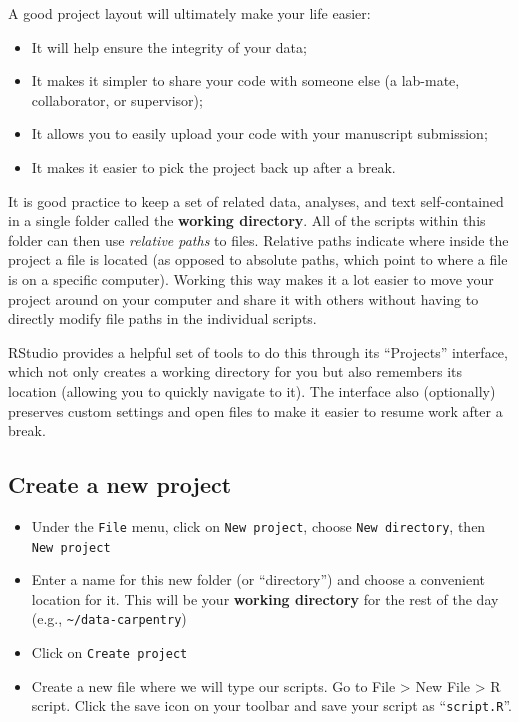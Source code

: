 \documentclass[]{book}
\providecommand{\tightlist}{%
  \setlength{\itemsep}{0pt}\setlength{\parskip}{0pt}}
\begin{document}
A good project layout will ultimately make your life easier:

\begin{itemize}
\tightlist
\item
  It will help ensure the integrity of your data;
\item
  It makes it simpler to share your code with someone else (a lab-mate,
  collaborator, or supervisor);
\item
  It allows you to easily upload your code with your manuscript
  submission;
\item
  It makes it easier to pick the project back up after a break.
\end{itemize}

It is good practice to keep a set of related data, analyses, and text
self-contained in a single folder called the \textbf{working directory}.
All of the scripts within this folder can then use \emph{relative paths}
to files. Relative paths indicate where inside the project a file is
located (as opposed to absolute paths, which point to where a file is on
a specific computer). Working this way makes it a lot easier to move
your project around on your computer and share it with others without
having to directly modify file paths in the individual scripts.

RStudio provides a helpful set of tools to do this through its
``Projects'' interface, which not only creates a working directory for
you but also remembers its location (allowing you to quickly navigate to
it). The interface also (optionally) preserves custom settings and open
files to make it easier to resume work after a break.

\subsection{Create a new project}\label{create-a-new-project}

\begin{itemize}
\tightlist
\item
  Under the \texttt{File} menu, click on \texttt{New\ project}, choose
  \texttt{New\ directory}, then \texttt{New\ project}
\item
  Enter a name for this new folder (or ``directory'') and choose a
  convenient location for it. This will be your \textbf{working
  directory} for the rest of the day (e.g.,
  \texttt{\textasciitilde{}/data-carpentry})
\item
  Click on \texttt{Create\ project}
\item
  Create a new file where we will type our scripts. Go to File
  \textgreater{} New File \textgreater{} R script. Click the save icon
  on your toolbar and save your script as ``\texttt{script.R}''.
\end{itemize}
\end{document}
